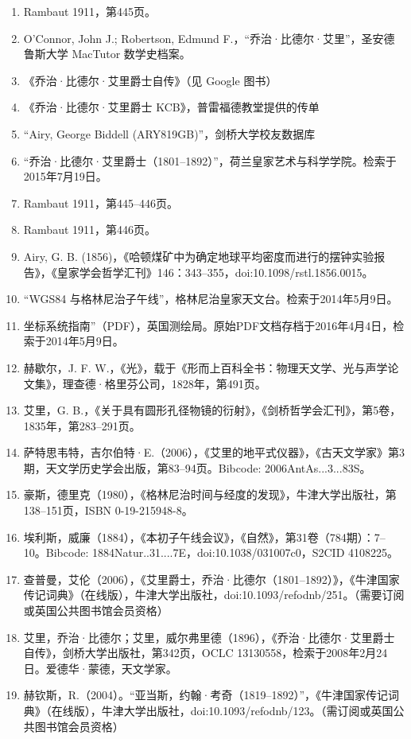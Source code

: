 \begin{enumerate}
\item Rambaut 1911，第445页。
\item O'Connor, John J.; Robertson, Edmund F.，“乔治·比德尔·艾里”，圣安德鲁斯大学 MacTutor 数学史档案。
\item 《乔治·比德尔·艾里爵士自传》（见 Google 图书）
\item 《乔治·比德尔·艾里爵士 KCB》，普雷福德教堂提供的传单
\item “Airy, George Biddell (ARY819GB)”，剑桥大学校友数据库
\item “乔治·比德尔·艾里爵士（1801–1892）”，荷兰皇家艺术与科学学院。检索于2015年7月19日。
\item Rambaut 1911，第445–446页。
\item Rambaut 1911，第446页。
\item Airy, G. B. (1856)，《哈顿煤矿中为确定地球平均密度而进行的摆钟实验报告》，《皇家学会哲学汇刊》146：343–355，doi:10.1098/rstl.1856.0015。
\item “WGS84 与格林尼治子午线”，格林尼治皇家天文台。检索于2014年5月9日。
\item 坐标系统指南”（PDF），英国测绘局。原始PDF文档存档于2016年4月4日，检索于2014年5月9日。
\item 赫歇尔，J. F. W.，《光》，载于《形而上百科全书：物理天文学、光与声学论文集》，理查德·格里芬公司，1828年，第491页。
\item 艾里，G. B.，《关于具有圆形孔径物镜的衍射》，《剑桥哲学会汇刊》，第5卷，1835年，第283–291页。
\item 萨特思韦特，吉尔伯特·E.（2006），《艾里的地平式仪器》，《古天文学家》第3期，天文学历史学会出版，第83–94页。Bibcode: 2006AntAs...3...83S。
\item 豪斯，德里克（1980），《格林尼治时间与经度的发现》，牛津大学出版社，第138–151页，ISBN 0-19-215948-8。
\item 埃利斯，威廉（1884），《本初子午线会议》，《自然》，第31卷（784期）：7–10。Bibcode: 1884Natur..31....7E，doi:10.1038/031007c0，S2CID 4108225。
\item 查普曼，艾伦（2006），《艾里爵士，乔治·比德尔（1801–1892）》，《牛津国家传记词典》（在线版），牛津大学出版社，doi:10.1093/ref\:odnb/251。（需要订阅或英国公共图书馆会员资格）
\item 艾里，乔治·比德尔；艾里，威尔弗里德（1896），《乔治·比德尔·艾里爵士自传》，剑桥大学出版社，第342页，OCLC 13130558，检索于2008年2月24日。爱德华·蒙德，天文学家。
\item 赫钦斯，R.（2004）。“亚当斯，约翰·考奇（1819–1892）”，《牛津国家传记词典》（在线版），牛津大学出版社，doi:10.1093/ref\:odnb/123。（需订阅或英国公共图书馆会员资格）

\end{enumerate}
